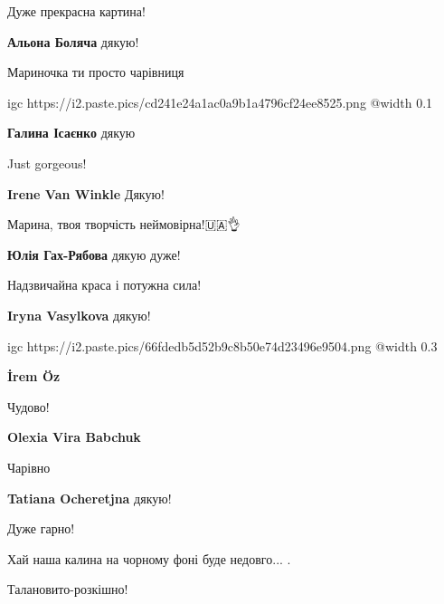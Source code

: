 
Дуже прекрасна картина!

\begin{itemize} %
\textbf{Альона Боляча} дякую!
\end{itemize} %


Мариночка ти просто чарівниця

\ifcmt
  igc https://i2.paste.pics/cd241e24a1ac0a9b1a4796cf24ee8525.png
	@width 0.1
\fi

\begin{itemize} %
\textbf{Галина Ісаєнко} дякую🥰🥰🥰
\end{itemize} %


Just gorgeous!

\begin{itemize} %
\textbf{Irene Van Winkle} Дякую!
\end{itemize} %


Марина, твоя творчість неймовірна!🇺🇦👌

\begin{itemize} %
\textbf{Юлія Гах-Рябова} дякую дуже!
\end{itemize} %


Надзвичайна краса і потужна сила!💙💛

\begin{itemize} %
\textbf{Iryna Vasylkova} дякую!💛
\end{itemize} %


\ifcmt
  igc https://i2.paste.pics/66fdedb5d52b9c8b50e74d23496e9504.png
	@width 0.3
\fi

\begin{itemize} %
\textbf{İrem Öz} 💛
\end{itemize} %


Чудово!

\begin{itemize} %
\textbf{Olexia Vira Babchuk} 💛
\end{itemize} %


Чарівно

\begin{itemize} %
\textbf{Tatiana Ocheretjna} дякую!
\end{itemize} %


Дуже гарно!

Хай наша калина на чорному фоні буде недовго... .


Талановито-розкішно!
